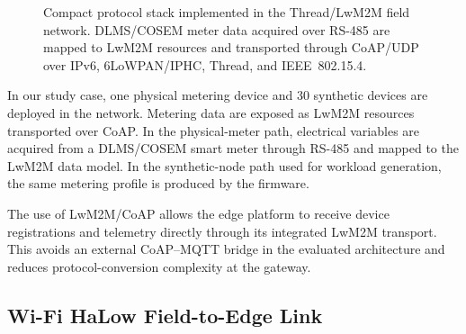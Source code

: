 \documentclass[conference]{IEEEtran}
\begin{document}
\begin{figure}[t]
{%
}
\caption{Compact protocol stack implemented in the Thread/LwM2M field network. DLMS/COSEM meter data acquired over RS-485 are mapped to LwM2M resources and transported through CoAP/UDP over IPv6, 6LoWPAN/IPHC, Thread, and IEEE~802.15.4.}
\label{fig:protocol_stack}
\end{figure}

In our study case, one physical metering device and 30 synthetic devices are deployed in the network. Metering data are exposed as LwM2M resources transported over CoAP. In the physical-meter path, electrical variables are acquired from a DLMS/COSEM smart meter through RS-485 and mapped to the LwM2M data model. In the synthetic-node path used for workload generation, the same metering profile is produced by the firmware.

The use of LwM2M/CoAP allows the edge platform to receive device registrations and telemetry directly through its integrated LwM2M transport. This avoids an external CoAP--MQTT bridge in the evaluated architecture and reduces protocol-conversion complexity at the gateway.

\subsection{Wi-Fi HaLow Field-to-Edge Link}
\label{subsec:halow_link}
\end{document}
